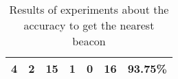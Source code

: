 \begin{table}[]
\begin{tabular}{@{}|c|r|r|r|r|r|r|@{}}
\textbf{4}                            & 2                                                                                                                          & 15                                & 1                                  & 0                                       & 16                                                                                                   & 93.75\%                                                   \\ \bottomrule
\end{tabular}
\caption[Nearest beacon experiments results]{Results of experiments about the accuracy to get the nearest beacon}
\label{tab:results_nearest_beacon}
\end{table}
